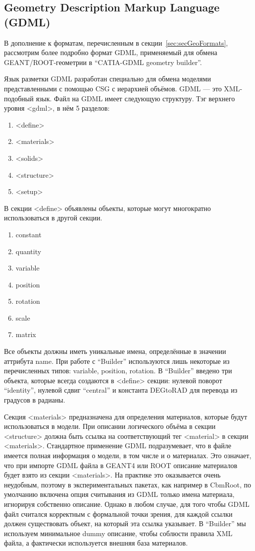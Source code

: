 \subsection{Geometry Description Markup Language (GDML)}\label{sec:secGDML}

В дополнение к форматам, перечисленным в секции~\ref{sec:secGeoFormats}, рассмотрим более подробно формат GDML, применяемый для обмена GEANT/ROOT-геометрии в ``CATIA-GDML geometry builder''.

Язык разметки GDML разработан специально для обмена моделями представленными с помощью CSG с иерархией объёмов. GDML --- это XML-подобный язык. Файл на GDML имеет следующую структуру. Тэг верхнего уровня <gdml>, в нём 5 разделов:
\begin{enumerate}
\item <define>
\item <materials>
\item <solids>
\item <structure>
\item <setup>
\end{enumerate}

В секции <define> объявлены объекты, которые могут многократно использоваться в другой секции.
\begin{enumerate}
\item constant
\item quantity
\item variable
\item position
\item rotation
\item scale
\item matrix
\end{enumerate}
Все объекты должны иметь уникальные имена, определённые в значении аттрибута name. При работе с ``Builder'' используются лишь некоторые из перечисленных типов: variable, position, rotation. В ``Builder'' введено три объекта, которые всегда создаются в <define> секции: нулевой поворот ``identity'', нулевой сдвиг ``central'' и константа DEGtoRAD для перевода из градусов в радианы.

Секция <materials> предназначена для определения материалов, которые будут использоваться в модели. При описании логического объёма в секции <structure> должна быть ссылка на соответствующий тег <material> в секции <materials>. Стандартное применение GDML подразумевает, что в файле имеется полная информация о модели, в том числе и о материалах. Это означает, что при импорте GDML файла в GEANT4 или ROOT описание материалов будет взято из секции <materials>. На практике это оказывается очень неудобным, поэтому в экспериментальных пакетах, как например в CbmRoot, по умолчанию включена опция считывания из GDML только имена материала, игнорируя собственно описание. Однако в любом случае, для того чтобы GDML файл считался корректным с формальной точки зрения, для каждой ссылки должен существовать объект, на который эта ссылка указывает. В ``Builder'' мы используем минимальное dummy \todo описание, чтобы соблюсти правила XML файла, а фактически используется внешняя база материалов.

